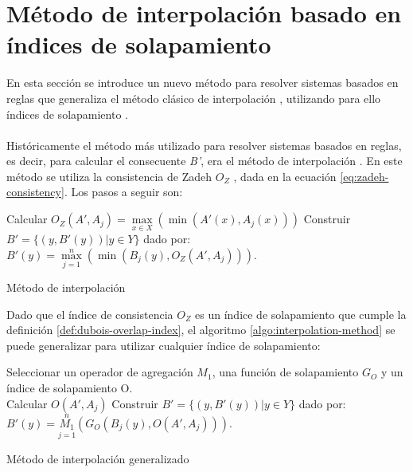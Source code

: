 \section{Método de interpolación basado en índices de solapamiento}
En esta sección se introduce un nuevo método para resolver sistemas basados en reglas que generaliza el método clásico de interpolación , utilizando para ello índices de solapamiento \cite{bustince2013overlap}.\\
\\
Históricamente el método más utilizado para resolver sistemas basados en reglas, es decir, para calcular el consecuente \emph{B'}, era el método de interpolación \cite{klir1987}. En este método se utiliza la consistencia de Zadeh \emph{$O_{Z}$} \cite{zadeh1978}, dada en la ecuación \ref{eq:zadeh-consistency}. Los pasos a seguir son:

\begin{algorithm}
\DontPrintSemicolon
{}
\vspace{0.4 cm}
 {
Calcular $O_{Z}(A',A_{j}) = \max\limits_{x \in X}(\min(A'(x),A_{j}(x))) $
}
Construir $B' = \{(y, B'(y))|y \in Y\}$ dado por: \\
\centering
\nonl $B'(y) = \max\limits_{j=1}^{n}(\min(B_{j}(y),O_{Z}(A', A_{j})))$.\\
\;
\caption{Método de interpolación}
\label{algo:interpolation-method}
\end{algorithm}
Dado que el índice de consistencia $O_{Z}$ es un índice de solapamiento que cumple la definición \ref{def:dubois-overlap-index}, el algoritmo \ref{algo:interpolation-method} se puede generalizar para utilizar cualquier índice de solapamiento:

\begin{algorithm}
\DontPrintSemicolon
{}
\vspace{0.4 cm}
Seleccionar un operador de agregación $M_{1}$, una función de solapamiento $G_{O}$ y un índice de solapamiento O.\\
 {
Calcular $O(A', A_{j})$
}
Construir $B' = \{(y, B'(y))|y \in Y\}$ dado por: \\
\centering
\nonl $B'(y) = \overset{n}{\underset{j=1}{M_{1}}}(G_{O}(B_{j}(y),O(A', A_{j})))$.\\
\;
\caption{Método de interpolación generalizado}
\label{algo:overlap-interpolation-method}
\end{algorithm}

